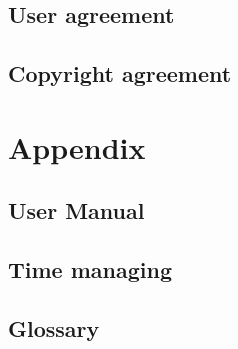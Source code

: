 \documentclass[a4paper,12pt]{scrreprt}
\begin{document}
\chapter*{User agreement}
\chapter*{Copyright agreement}
\part{Appendix}

\chapter*{User Manual}
\chapter*{Time managing}
\chapter*{Glossary}

\thispagestyle{fancy}
\end{document}
